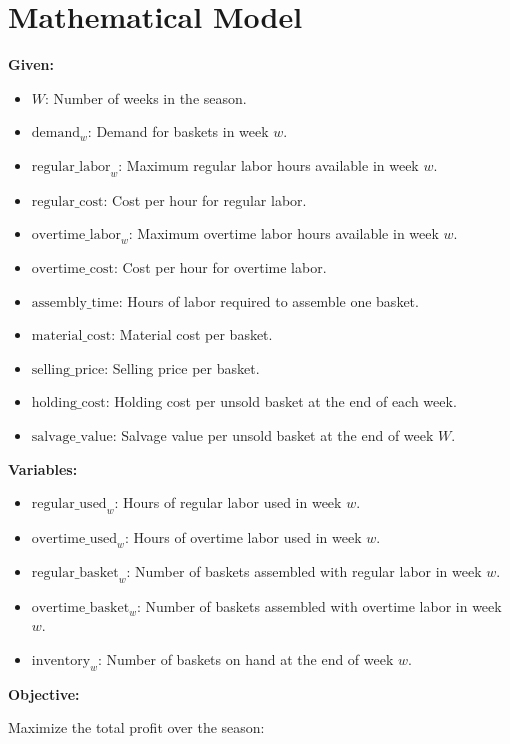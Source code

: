 \documentclass{article}
\begin{document}
\section*{Mathematical Model}

\textbf{Given:}
\begin{itemize}
    \item $W$: Number of weeks in the season.
    \item $\text{demand}_{w}$: Demand for baskets in week $w$.
    \item $\text{regular\_labor}_{w}$: Maximum regular labor hours available in week $w$.
    \item $\text{regular\_cost}$: Cost per hour for regular labor.
    \item $\text{overtime\_labor}_{w}$: Maximum overtime labor hours available in week $w$.
    \item $\text{overtime\_cost}$: Cost per hour for overtime labor.
    \item $\text{assembly\_time}$: Hours of labor required to assemble one basket.
    \item $\text{material\_cost}$: Material cost per basket.
    \item $\text{selling\_price}$: Selling price per basket.
    \item $\text{holding\_cost}$: Holding cost per unsold basket at the end of each week.
    \item $\text{salvage\_value}$: Salvage value per unsold basket at the end of week $W$.
\end{itemize}

\textbf{Variables:}
\begin{itemize}
    \item $\text{regular\_used}_{w}$: Hours of regular labor used in week $w$.
    \item $\text{overtime\_used}_{w}$: Hours of overtime labor used in week $w$.
    \item $\text{regular\_basket}_{w}$: Number of baskets assembled with regular labor in week $w$.
    \item $\text{overtime\_basket}_{w}$: Number of baskets assembled with overtime labor in week $w$.
    \item $\text{inventory}_{w}$: Number of baskets on hand at the end of week $w$.
\end{itemize}

\textbf{Objective:}

Maximize the total profit over the season:
\end{document}
